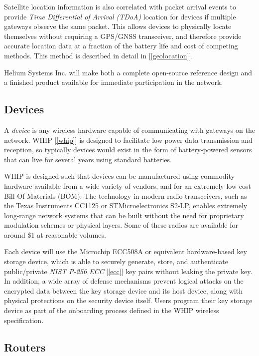 \documentclass[letterpaper,11pt]{article}
\begin{document}
Satellite location information is also correlated with packet arrival events to provide \textit{Time Differential of Arrival (TDoA)} location for devices if multiple gateways observe the same packet. This allows devices to physically locate themselves without requiring a GPS/GNSS transceiver, and therefore provide accurate location data at a fraction of the battery life and cost of competing methods. This method is described in detail in [\ref{geolocation}].\newline

Helium Systems Inc. will make both a complete open-source reference design and a finished product available for immediate participation in the network.

\subsection{Devices} \label{devices}

A \textit{device} is any wireless hardware capable of communicating with gateways on the network. WHIP [\ref{whip}] is designed to facilitate low power data transmission and reception, so typically devices would exist in the form of battery-powered sensors that can live for several years using standard batteries.\newline

WHIP is designed such that devices can be manufactured using commodity hardware available from a wide variety of vendors, and for an extremely low cost Bill Of Materials (BOM). The technology in modern radio transceivers, such as the Texas Instruments CC1125 or STMicroelectronics S2-LP, enables extremely long-range network systems that can be built without the need for proprietary modulation schemes or physical layers. Some of these radios are available for around \$1 at reasonable volumes.\newline

Each device will use the Microchip ECC508A\cite{ecc} or equivalent hardware-based key storage device, which is able to securely generate, store, and authenticate public/private \textit{NIST P-256 ECC} [\ref{ecc}] key pairs without leaking the private key. In addition, a wide array of defense mechanisms prevent logical attacks on the encrypted data between the key storage device and its host device, along with physical protections on the security device itself. Users program their key storage device as part of the onboarding process defined in the WHIP wireless specification.

\subsection{Routers}
\end{document}
